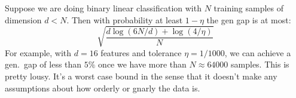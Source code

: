 







      \newpage




        Suppose we are doing binary linear classification with $N$ training
        samples of dimension $d< N$.  Then with probability at least $1-\eta$
        the gen gap is at most:
        $$
          \sqrt{\frac{d\log(6N/d) + \log(4/\eta)}{N}}
        $$
        For example, with $d=16$ features and tolerance $\eta=1/1000$, we
        can achieve a gen.\ gap of less than $5\%$ once we have more than
        $N\approx 64000$ samples.  This is pretty lousy.  It's a worst case
        bound in the sense that it doesn't make any assumptions about how
        orderly or gnarly the data is.

